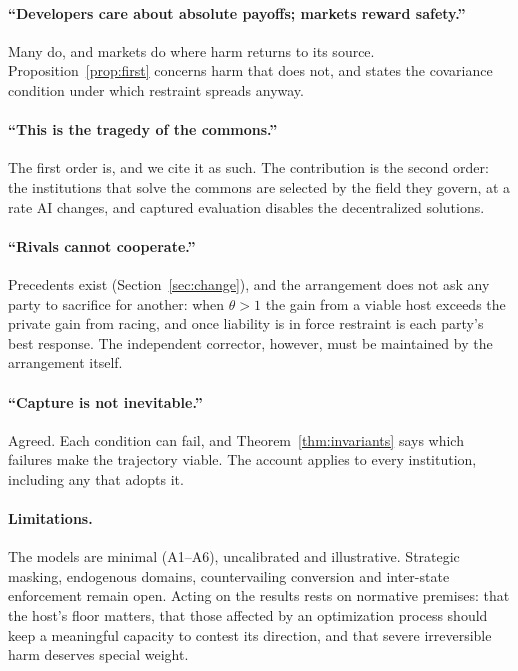 \documentclass[letterpaper]{article} %
\theoremstyle{definition}
\begin{document}
\paragraph{``Developers care about absolute payoffs; markets reward safety.''} Many do, and markets do where harm returns to its source. Proposition~\ref{prop:first} concerns harm that does not, and states the covariance condition under which restraint spreads anyway.

\paragraph{``This is the tragedy of the commons.''} The first order is, and we cite it as such. The contribution is the second order: the institutions that solve the commons are selected by the field they govern, at a rate AI changes, and captured evaluation disables the decentralized solutions.

\paragraph{``Rivals cannot cooperate.''} Precedents exist (Section~\ref{sec:change}), and the arrangement does not ask any party to sacrifice for another: when $\theta>1$ the gain from a viable host exceeds the private gain from racing, and once liability is in force restraint is each party's best response. The independent corrector, however, must be maintained by the arrangement itself.

\paragraph{``Capture is not inevitable.''} Agreed. Each condition can fail, and Theorem~\ref{thm:invariants} says which failures make the trajectory viable. The account applies to every institution, including any that adopts it.

\paragraph{Limitations.} The models are minimal (A1--A6), uncalibrated and illustrative. Strategic masking, endogenous domains, countervailing conversion and inter-state enforcement remain open. Acting on the results rests on normative premises: that the host's floor matters, that those affected by an optimization process should keep a meaningful capacity to contest its direction, and that severe irreversible harm deserves special weight.
\end{document}
